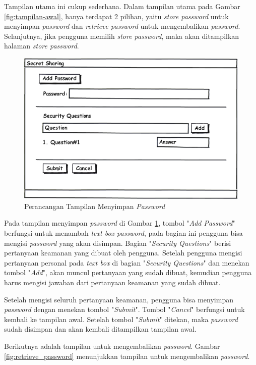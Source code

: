 Tampilan utama ini cukup sederhana. Dalam tampilan utama pada Gambar \ref{fig:tampilan-awal}, hanya terdapat 2 pilihan, yaitu \textit{store password} untuk menyimpan \textit{password} dan \textit{retrieve password} untuk mengembalikan \textit{password}. Selanjutnya, jika pengguna memilih \textit{store password}, maka akan ditampilkan halaman \textit{store password}.

\begin{figure}[H]
	\centerline{\includegraphics[scale=0.5]{Gambar/store_password}}
	\caption{Perancangan Tampilan Menyimpan \textit{Password}}\label{fig:store_password}
\end{figure}

Pada tampilan menyimpan \textit{password} di Gambar \ref{fig:store_password}, tombol "\textit{Add Password}" berfungsi untuk menambah \textit{text box password}, pada bagian ini pengguna bisa mengisi \textit{password} yang akan disimpan. Bagian "\textit{Security Questions}" berisi pertanyaan keamanan yang dibuat oleh pengguna. Setelah pengguna mengisi pertanyaan personal pada \textit{text box} di bagian "\textit{Security Questions}" dan menekan tombol "\textit{Add}", akan muncul pertanyaan yang sudah dibuat, kemudian pengguna harus mengisi jawaban dari pertanyaan keamanan yang sudah dibuat.

Setelah mengisi seluruh pertanyaan keamanan, pengguna bisa menyimpan \textit{password} dengan menekan tombol "\textit{Submit}". Tombol "\textit{Cancel}" berfungsi untuk kembali ke tampilan awal. Setelah tombol "\textit{Submit}" ditekan, maka \textit{password} sudah disimpan dan akan kembali ditampilkan tampilan awal.

Berikutnya adalah tampilan untuk mengembalikan \textit{password}. Gambar \ref{fig:retrieve_password} menunjukkan tampilan untuk mengembalikan \textit{password}.

